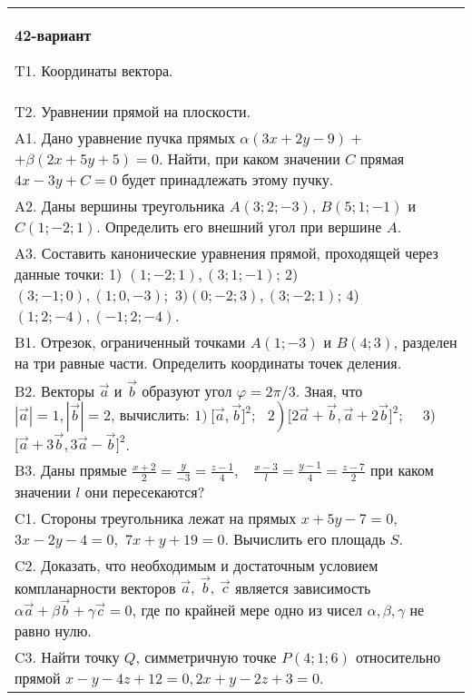 \documentclass{article}
\begin{document}
\vspace{1cm}


\begin{tabular}{m{17cm}}
\textbf{42-вариант}
\newline

T1. 
Координаты вектора.
 \\
T2. Уравнении прямой на плоскости.
 \\
A1. 
Дано уравнение пучка прямых \(\alpha(3x + 2y - 9) +\) \(+ \beta(2x + 5y + 5) = 0\). Найти, при каком значении \(C\) прямая \(4x - 3y + C = 0\) будет принадлежать этому пучку.
 \\
A2. 
Даны вершины треугольника \(A(3;2; - 3)\), \(B(5;1; - 1)\) и \(C(1; - 2;1)\). Определить его внешний угол при вершине \(A\).
 \\
A3. 
Составить канонические уравнения прямой, проходящей через данные точки: 1) \((1; - 2;1),(3;1; - 1)\); 2) \((3; - 1;0),(1;0, - 3);\) \(3)(0; - 2;3),(3; - 2;1)\); 4) \((1;2; - 4),( - 1;2; - 4)\).
 \\
B1. 
Отрезок, ограниченный точками \(A(1; - 3)\) и \(B(4;3)\), разделен на три равные части. Определить координаты точек деления.
 \\
B2. 
Векторы \(\overrightarrow{a}\) и \(\overrightarrow{b}\) образуют угол \(\varphi = 2\pi/3\). Зная, что \(|\overrightarrow{a}| = 1,|\overrightarrow{b}| = 2\), вычислить: \(1)\left. \ \lbrack\overrightarrow{a},\overrightarrow{b}\rbrack^{2};\ \ \ 2 \right)\lbrack 2\overrightarrow{a} + \overrightarrow{b},\overrightarrow{a} + 2\overrightarrow{b}\rbrack^{2};\ \ \ \ \) 3) \(\lbrack\overrightarrow{a} + 3\overrightarrow{b},3\overrightarrow{a} - \overrightarrow{b}\rbrack^{2}\).
 \\
B3. 
Даны прямые \(\frac{x + 2}{2} = \frac{y}{- 3} = \frac{z - 1}{4},\ \ \ \ \frac{x - 3}{l} = \frac{y - 1}{4} = \frac{z - 7}{2}\) при каком значении \(l\) они пересекаются?
 \\
C1. 
Стороны треугольника лежат на прямых \(x + 5y - 7 = 0,\) \(3x - 2y - 4 = 0,\) \(7x + y + 19 = 0\). Вычислить его площадь \(S\).
 \\
C2. 
Доказать, что необходимым и достаточным условием компланарности векторов \(\overrightarrow{a},\ \overrightarrow{b},\ \overrightarrow{c}\) является зависимость \(\alpha\overrightarrow{a} + \beta\overrightarrow{b} + \gamma\overrightarrow{c} = 0\), где по крайней мере одно из чисел \(\alpha,\beta,\gamma\) не равно нулю.
 \\
C3. 
Найти точку \(Q\), симметричную точке \(P(4;1;6)\) относительно прямой \(x - y - 4z + 12 = 0,2x + y - 2z + 3 = 0\).
 \\

\end{tabular}
\vspace{1cm}
\end{document}

